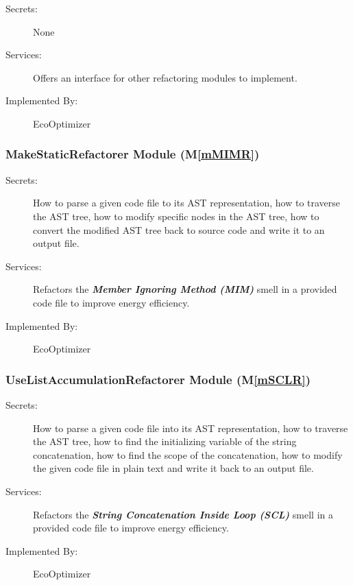 \documentclass[12pt, titlepage]{article}
\newcommand{\mref}[1]{M\ref{#1}}
\begin{document}

\begin{description}
    \item[Secrets:] None
    \item[Services:] Offers an interface for other refactoring modules to implement.
    \item[Implemented By:] EcoOptimizer
\end{description}

\subsubsection{MakeStaticRefactorer Module (\mref{mMIMR})}

\begin{description}
\item[Secrets:] How to parse a given code file to its AST representation, how to traverse the AST tree, how to modify specific nodes in the AST tree, how to convert the modified AST tree back to source code and write it to an output file.
\item[Services:] Refactors the \textit{\textbf{Member Ignoring Method (MIM)}} smell in a provided code file to improve energy efficiency.
\item[Implemented By:] EcoOptimizer
\end{description}

\subsubsection{UseListAccumulationRefactorer Module (\mref{mSCLR})}


\begin{description}
\item[Secrets:] How to parse a given code file into its AST representation, how to traverse the AST tree, how to find the initializing variable of the string concatenation, how to find the scope of the concatenation, how to modify the given code file in plain text and write it back to an output file.
\item[Services:] Refactors the \textbf{\textit{String Concatenation Inside Loop (SCL)}} smell in a provided code file to improve energy efficiency.
\item[Implemented By:] EcoOptimizer
\end{description}
\end{document}
